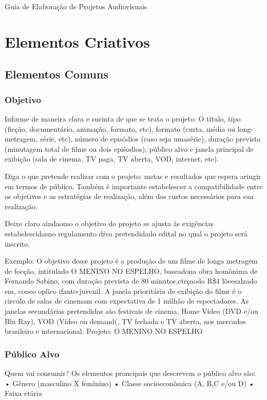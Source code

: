 Guia de Elaboração de Projetos Audiovisuais

\part{Elementos Criativos}

\chapter{Elementos Comuns}

\section{Objetivo}

Informe de maneira clara e sucinta de que se trata o projeto: O título, tipo (ficção, documentário, animação, formato, etc), formato (curta, média ou long-metragem, série, etc), número de episódios (caso seja umasérie), duração prevista (minutagem total de filme ou dois epiśodios), público alvo e janela principal de exibição (sala de cinema, TV paga, TV aberta, VOD, internet, etc).

Diga o que pretende realizar com o projeto: metas e resultados que espera aringir em termos de público. Também é importante estabelescer a compatibilidade entre os objetivos e as estratégias de realização, além dos custos necessários para sua realização.

Deixe claro aindaomo o objetivo do projeto se ajusta às exigências estabelescidasno regulamento dŕea pretendidado edital no qual o projeto será inscrito.

Exemplo:
O objetivo desse projeto é a produção de um filme de longa metragem de focção, intitulado O MENINO NO ESPELHO, baseadona obra homônima de Fernando Sabino, com duração prevista de 80 minutos,ctrçaodo R\$4 lõeesalzado em, cooco oplico ifanto-juvenil.
A janela prioritária de exibição do filmr é o circulo de salas de cinemam com expectativa de 1 milhão de espectadores. As janelas secundárias pretendidas são festivais de cinema, Home Vídeo (DVD e/ou Blu Ray), VOD (Vídeo on demand(, TV fechada e TV aberta, nos mercados brasileiro e internacional.
Projeto: O MENINO NO ESPELHO

\section{Público Alvo}

Quem vai consumir?
Os elementos proncipais que descrevem o público alvo são:
    • Gênero (masculino X feminino)
    • Classe socioeconômica (A, B,C e/ou D)
    • Faixa etária

